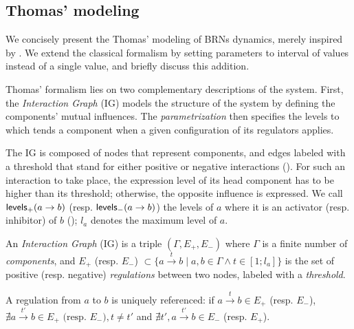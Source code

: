 \subsection{Thomas' modeling}
We concisely present the Thomas' modeling of BRNs dynamics, merely inspired by
\cite{Richard06,BernotSemBRN}.
We extend the classical formalism by setting parameters to interval of values instead of a single
value, and briefly discuss this addition.

Thomas' formalism lies on two complementary descriptions of the system. First, the
\emph{Interaction Graph} (IG) models the structure of the system by defining the components'
mutual influences.
The \emph{parametrization} then specifies the levels to which tends a component when a given
configuration of its regulators applies.

The IG is composed of nodes that represent components, and edges labeled with a threshold that stand
for either positive or negative interactions ().
For such an interaction to take place, the expression level of its head component has to be higher than its threshold; otherwise, the opposite influence is expressed.
We call $\mathsf{levels}_+(a\rightarrow b)$ (resp. $\mathsf{levels}_-(a\rightarrow b)$) the levels of $a$ where it is an
activator (resp. inhibitor) of $b$ ();
$l_a$ denotes the maximum level of $a$.

\begin{definition}
\label{def:ig}
An \emph{Interaction Graph} (IG) is a triple $(\Gamma, E_+, E_-)$ where $\Gamma$ is a finite number of \emph{components},
and $E_+$ (resp. $E_-$) $\subset \{a \xrightarrow{t} b \mid a, b \in \Gamma \wedge t \in [1; l_a]\}$
is the set of positive (resp. negative) \emph{regulations} between two nodes, labeled with a \emph{threshold}.

A regulation from $a$ to $b$ is uniquely referenced:
if $a \xrightarrow{t} b \in E_+$ (resp. $E_-$),
$\nexists a \xrightarrow{t'} b \in E_+ \text{ (resp. $E_-$)}, t \neq t'$
and $\nexists t', a \xrightarrow{t'} b \in E_-$ (resp. $E_+$).
\end{definition}

